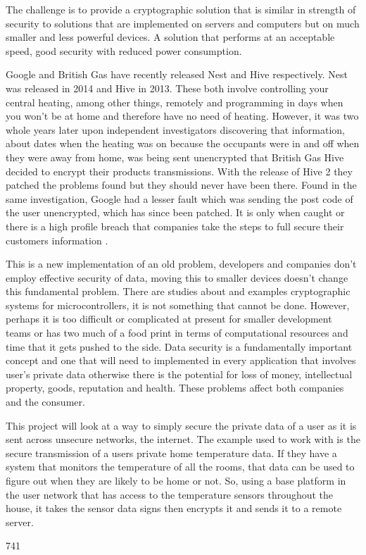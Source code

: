 	The challenge is to provide a cryptographic solution that is similar in strength of security to solutions that are implemented on servers and computers but on much smaller and less powerful devices. A solution that performs at an acceptable speed, good security with reduced power consumption.
	
	Google and British Gas have recently released Nest and Hive respectively. Nest was released in 2014 and Hive in 2013. These both involve controlling your central heating, among other things, remotely and programming in days when you won't be at home and therefore have no need of heating. However, it was two whole years later upon independent investigators discovering that information, about dates when the heating was on because the occupants were in and off when they were away from home, was being sent unencrypted that British Gas Hive decided to encrypt their products transmissions. With the release of Hive 2 they patched the problems found but they should never have been there. Found in the same investigation, Google had a lesser fault which was sending the post code of the user unencrypted, which has since been patched. It is only when caught or there is a high profile breach that companies take the steps to full secure their customers information \cite{which}. 
	
	This is a new implementation of an old problem, developers and companies don't employ effective security of data, moving this to smaller devices doesn't change this fundamental problem. There are studies about and examples cryptographic systems for microcontrollers, it is not something that cannot be done. However, perhaps it is too difficult or complicated at present for smaller development teams or has two much of a food print in terms of computational resources and time that it gets pushed to the side. Data security is a fundamentally important concept and one that will need to implemented in every application that involves user's private data otherwise there is the potential for loss of money, intellectual property, goods, reputation and health. These problems affect both companies and the consumer.
	
	This project will look at a way to simply secure the private data of a user as it is sent across unsecure networks, the internet. The example used to work with is the secure transmission of a users private home temperature data. If they have a system that monitors the temperature of all the rooms, that data can be used to figure out when they are likely to be home or not. So, using a base platform in the user network that has access to the temperature sensors throughout the house, it takes the sensor data signs then encrypts it and sends it to a remote server. 
	
	
	741